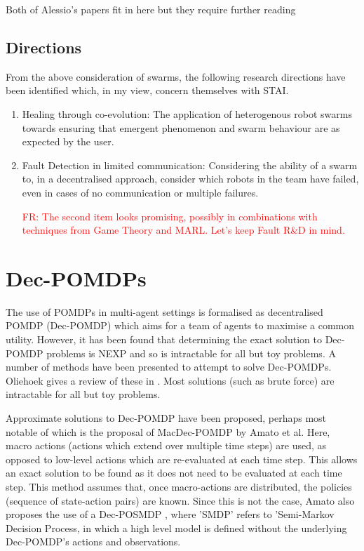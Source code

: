 \documentclass[preprint,11pt]{report}
\newcommand\fr[1]{\textcolor{red}{FR: #1}}
\begin{document}
Both of Alessio's papers \cite{Kouvaros2019FormalSystems, Lomuscio2019ASystems} fit in here but they
require further reading

\subsection{Directions}

From the above consideration of swarms, the following research
directions have been identified which, in my view, concern themselves
with STAI.

\begin{enumerate} \item Healing through co-evolution: The application of heterogenous robot swarms
towards ensuring that emergent phenomenon and swarm behaviour are as
expected by the user.


\item Fault Detection in limited communication:
Considering the ability of a swarm to, in a decentralised approach,
consider which robots in the team have failed, even in cases of no
communication or multiple failures.

\fr{The second item looks promising, possibly in combinations with
  techniques from Game Theory and MARL. Let's keep Fault R\&D in
  mind.}


\end{enumerate}

\section{Dec-POMDPs}

The use of POMDPs in multi-agent settings is formalised as
decentralised POMDP (Dec-POMDP) which aims for a team of agents to
maximise a common utility. However, it has been found that determining
the exact solution to Dec-POMDP problems is NEXP \cite{Eker2011} and
so is intractable for all but toy problems. A number of methods have
been presented to attempt to solve Dec-POMDPs. Oliehoek gives a review
of these in \cite{OliehoekDecentralizedPOMDPs}. Most solutions (such
as brute force) are intractable for all but toy problems.

Approximate solutions to Dec-POMDP have been proposed, perhaps most
notable of which is the proposal of MacDec-POMDP \cite{Amato2015} by
Amato et al. Here, macro actions (actions which extend over multiple
time steps) are used, as opposed to low-level actions which are
re-evaluated at each time step. This allows an exact solution to be
found as it does not need to be evaluated at each time step. This
method assumes that, once macro-actions are distributed, the policies
(sequence of state-action pairs) are known. Since this is not the
case, Amato also proposes the use of a Dec-POSMDP
\cite{Amato2017Decision-MakingLearning}, where 'SMDP' refers to
'Semi-Markov Decision Process, in which a high level model is defined
without the underlying Dec-POMDP's actions and observations.
\end{document}
